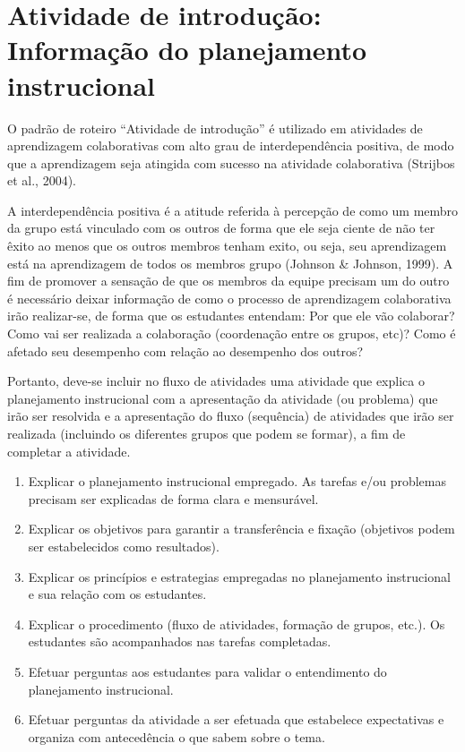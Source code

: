 
\section{Atividade de introdução: Informação do planejamento instrucional}

O padrão de roteiro ``Atividade de introdução'' é utilizado em atividades de aprendizagem colaborativas com alto grau de interdependência positiva, de modo que a aprendizagem seja atingida com sucesso na atividade colaborativa (Strijbos et al., 2004).

A interdependência positiva é a atitude referida à percepção de como um membro da grupo está vinculado com os outros de forma que ele seja ciente de não ter êxito ao menos que os outros membros tenham exito, ou seja, seu aprendizagem está na aprendizagem de todos os membros grupo (Johnson & Johnson, 1999). A fim de promover a sensação de que os membros da equipe precisam um do outro é necessário deixar informação de como o processo de aprendizagem colaborativa irão realizar-se, de forma que os estudantes entendam: Por que ele vão colaborar? Como vai ser realizada a colaboração (coordenação entre os grupos, etc)? Como é afetado seu desempenho com relação ao desempenho dos outros?

Portanto, deve-se incluir no fluxo de atividades uma atividade que explica o planejamento instrucional com a apresentação da atividade (ou problema) que irão ser resolvida e a apresentação do fluxo (sequência) de atividades que irão ser realizada (incluindo os diferentes grupos que podem se formar), a fim de completar a atividade.

\begin{enumerate}
\item Explicar o planejamento instrucional empregado. As tarefas e/ou problemas precisam ser explicadas de forma clara e mensurável.
\item Explicar os objetivos para garantir a transferência e fixação (objetivos podem ser estabelecidos como resultados).
\item Explicar os princípios e estrategias empregadas no planejamento instrucional e sua relação com os estudantes.
\item Explicar o procedimento (fluxo de atividades, formação de grupos, etc.). Os estudantes são acompanhados nas tarefas completadas.
\item Efetuar perguntas aos estudantes para validar o entendimento do planejamento instrucional.
\item Efetuar perguntas da atividade a ser efetuada que estabelece expectativas e organiza com antecedência o que sabem sobre o tema.
\end{enumerate}


